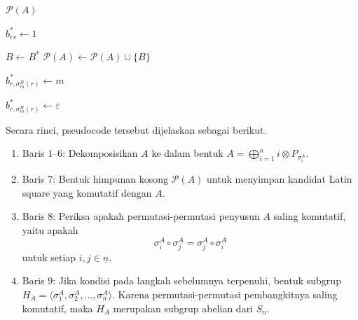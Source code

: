 \begin{algoritma}
\begin{algorithm}
\begin{algorithmic}[1]
      \State {}
      \EndFor

      \State \Return $\mathcal{P}(A)$

      \State $b^*_{rs}\gets 1$
      \EndIf
      \EndFor
      \EndFor

      \State $B\gets B^*$
      \State $\mathcal{P}(A)\gets\mathcal{P}(A)\cup\{B\}$
      \EndIf

      \State \Return
      \EndIf

      \State $b^*_{r,\sigma_m^B(r)}\gets m$
      \EndFor

      \State {}
      \EndIf

      \State $b^*_{r,\sigma_m^B(r)}\gets\varepsilon$
      \EndFor
      \EndIf
      \EndFor
      \EndProcedure
    \end{algorithmic}
  \end{algorithm}
  Secara rinci, pseudocode tersebut dijelaskan sebagai berikut.
  \begin{enumerate}
    \item Baris $1$--$6$: Dekomposisikan $A$ ke dalam bentuk
          $A=\bigoplus_{i=1}^{n} i\otimes P_{\sigma_i^A}$.

    \item Baris $7$: Bentuk himpunan kosong $\mathcal{P}(A)$ untuk menyimpan kandidat Latin square yang komutatif dengan $A$.

    \item Baris $8$: Periksa apakah permutasi-permutasi penyusun $A$ saling komutatif, yaitu apakah
          \[
            \sigma_i^A\circ\sigma_j^A
            =
            \sigma_j^A\circ\sigma_i^A
          \]
          untuk setiap $i,j\in \underline{n}$.

    \item Baris $9$: Jika kondisi pada langkah sebelumnya terpenuhi, bentuk subgrup
          $H_A=\langle \sigma_1^A,\sigma_2^A,\ldots,\sigma_n^A\rangle$.
          Karena permutasi-permutasi pembangkitnya saling komutatif, maka $H_A$ merupakan subgrup abelian dari $S_n$.


\end{enumerate}
\end{algoritma}
